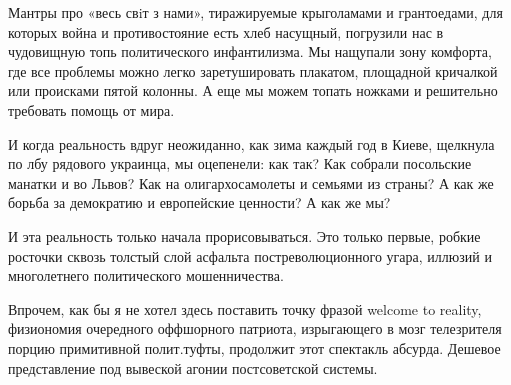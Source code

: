 Мантры про «весь свiт з нами», тиражируемые крыголамами и грантоедами, для
которых война и противостояние есть хлеб насущный, погрузили нас в чудовищную
топь политического инфантилизма. Мы нащупали зону комфорта, где все проблемы
можно легко заретушировать плакатом, площадной кричалкой или происками пятой
колонны. А еще мы можем топать ножками и решительно требовать помощь от мира.

И когда реальность вдруг неожиданно, как зима каждый год в Киеве, щелкнула по
лбу рядового украинца, мы оцепенели: как так? Как собрали посольские манатки и
во Львов? Как на олигархосамолеты и семьями из страны? А как же борьба за
демократию и европейские ценности? А как же мы?

И эта реальность только начала прорисовываться. Это только первые, робкие
росточки сквозь толстый слой асфальта постреволюционного угара, иллюзий и
многолетнего политического мошенничества.

Впрочем, как бы я не хотел здесь поставить точку фразой welcome to reality,
физиономия очередного оффшорного патриота, изрыгающего в мозг телезрителя
порцию примитивной полит.туфты, продолжит этот спектакль абсурда. Дешевое
представление под вывеской агонии постсоветской системы.
